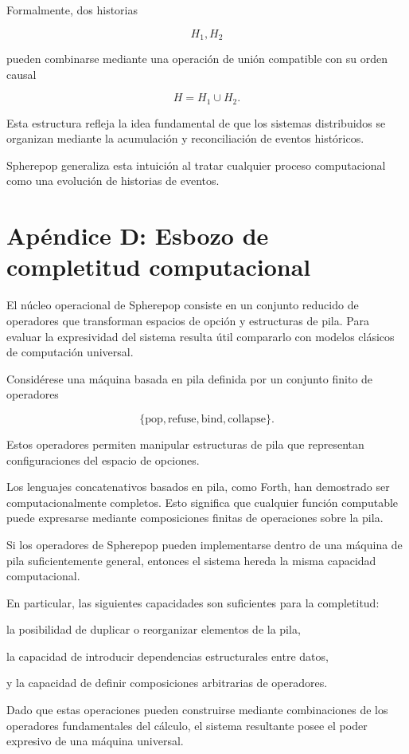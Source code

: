 \documentclass[12pt]{article}
\begin{document}
Formalmente, dos historias

\[
H_1, H_2
\]

pueden combinarse mediante una operación de unión compatible con su orden causal

\[
H = H_1 \cup H_2 .
\]

Esta estructura refleja la idea fundamental de que los sistemas distribuidos se organizan mediante la acumulación y reconciliación de eventos históricos.

Spherepop generaliza esta intuición al tratar cualquier proceso computacional como una evolución de historias de eventos.

\section{Apéndice D: Esbozo de completitud computacional}

El núcleo operacional de Spherepop consiste en un conjunto reducido de operadores que transforman espacios de opción y estructuras de pila. Para evaluar la expresividad del sistema resulta útil compararlo con modelos clásicos de computación universal.

Considérese una máquina basada en pila definida por un conjunto finito de operadores

\[
\{ \mathrm{pop}, \mathrm{refuse}, \mathrm{bind}, \mathrm{collapse} \}.
\]

Estos operadores permiten manipular estructuras de pila que representan configuraciones del espacio de opciones.

Los lenguajes concatenativos basados en pila, como Forth, han demostrado ser computacionalmente completos. Esto significa que cualquier función computable puede expresarse mediante composiciones finitas de operaciones sobre la pila.

Si los operadores de Spherepop pueden implementarse dentro de una máquina de pila suficientemente general, entonces el sistema hereda la misma capacidad computacional.

En particular, las siguientes capacidades son suficientes para la completitud:

la posibilidad de duplicar o reorganizar elementos de la pila,

la capacidad de introducir dependencias estructurales entre datos,

y la capacidad de definir composiciones arbitrarias de operadores.

Dado que estas operaciones pueden construirse mediante combinaciones de los operadores fundamentales del cálculo, el sistema resultante posee el poder expresivo de una máquina universal.
\end{document}
